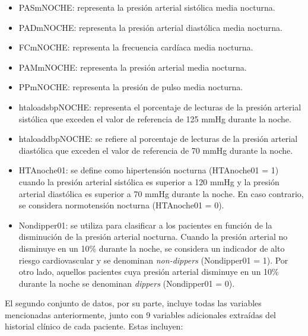 \begin{itemize}
  \item PASmNOCHE: representa la presión arterial sistólica media nocturna.
  \item PADmNOCHE: representa la presión arterial diastólica media nocturna.
  \item FCmNOCHE: representa la frecuencia cardíaca media nocturna.
	\item PAMmNOCHE: representa la presión arterial media nocturna.
	\item PPmNOCHE: representa la presión de pulso media nocturna.
  \item htaloadsbpNOCHE: representa el porcentaje de lecturas de la presión arterial sistólica que exceden el valor de referencia de 125 mmHg durante la noche.
  \item htaloaddbpNOCHE: se refiere al porcentaje de lecturas de la presión arterial diastólica que exceden el valor de referencia de 70 mmHg durante la noche.
  \item HTAnoche01: se define como hipertensión nocturna (HTAnoche01 = 1) cuando la presión arterial sistólica es superior a 120 mmHg y la presión arterial diastólica es superior a 70 mmHg durante la noche. En caso contrario, se considera normotensión nocturna (HTAnoche01 = 0).
  \item Nondipper01: se utiliza para clasificar a los pacientes en función de la disminución de la presión arterial nocturna. Cuando la presión arterial no disminuye en un 10\% durante la noche, se considera un indicador de alto riesgo cardiovascular y se denominan \emph{non-dippers} (Nondipper01 = 1). Por otro lado, aquellos pacientes cuya presión arterial disminuye en un 10\% durante la noche se denominan \emph{dippers} (Nondipper01 = 0).
\end{itemize}


El segundo conjunto de datos, por su parte, incluye todas las variables mencionadas anteriormente, junto con
9 variables adicionales extraídas del historial clínico de cada paciente. Estas incluyen:


